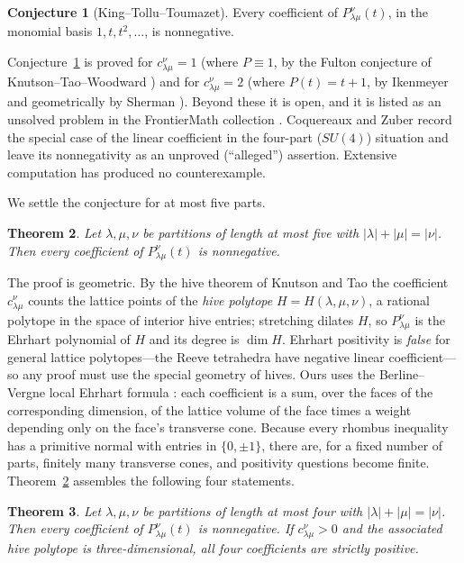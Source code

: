 \documentclass[11pt]{amsart}
\newtheorem{theorem}{Theorem}
\theoremstyle{definition}
\newtheorem{conjecture}[theorem]{Conjecture}
\newcommand{\lam}{\lambda}
\begin{document}
\begin{conjecture}[King--Tollu--Toumazet]\label{conj:ktt}
Every coefficient of $P^{\nu}_{\lam\mu}(t)$, in the monomial basis
$1,t,t^2,\dots$, is nonnegative.
\end{conjecture}

Conjecture~\ref{conj:ktt} is proved for $c^{\nu}_{\lam\mu}=1$
(where $P\equiv 1$, by the Fulton conjecture of Knutson--Tao--Woodward
\cite{KTW}) and for $c^{\nu}_{\lam\mu}=2$ (where $P(t)=t+1$, by Ikenmeyer
\cite{Ikenmeyer} and geometrically by Sherman \cite{Sherman}). Beyond these it
is open, and it is listed as an unsolved problem in the FrontierMath collection
\cite{FrontierMath}. Coquereaux and Zuber \cite{CoqZuber} record the special
case of the linear coefficient in the four-part ($SU(4)$) situation and leave
its nonnegativity as an unproved (``alleged'') assertion. Extensive computation
has produced no counterexample.

We settle the conjecture for at most five parts.

\begin{theorem}\label{thm:main}
Let $\lam,\mu,\nu$ be partitions of length at most five with
$|\lam|+|\mu|=|\nu|$. Then every coefficient of $P^{\nu}_{\lam\mu}(t)$ is
nonnegative.
\end{theorem}

The proof is geometric. By the hive theorem of Knutson and Tao \cite{KnutsonTao}
the coefficient $c^{\nu}_{\lam\mu}$ counts the lattice points of the
\emph{hive polytope} $H=H(\lam,\mu,\nu)$, a rational polytope in the space of
interior hive entries; stretching dilates $H$, so $P^{\nu}_{\lam\mu}$ is the
Ehrhart polynomial of $H$ and its degree is $\dim H$. Ehrhart positivity is
\emph{false} for general lattice polytopes---the Reeve tetrahedra have negative
linear coefficient---so any proof must use the special geometry of hives. Ours
uses the Berline--Vergne local Ehrhart formula \cite{BerlineVergne,RingSchurmann}:
each coefficient is a sum, over the faces of the corresponding dimension, of the
lattice volume of the face times a weight depending only on the face's
transverse cone. Because every rhombus inequality has a primitive normal with
entries in $\{0,\pm1\}$, there are, for a fixed number of parts, finitely many
transverse cones, and positivity questions become finite. Theorem~\ref{thm:main}
assembles the following four statements.

\begin{theorem}\label{thm:four}
Let $\lam,\mu,\nu$ be partitions of length at most four with
$|\lam|+|\mu|=|\nu|$. Then every coefficient of $P^{\nu}_{\lam\mu}(t)$ is
nonnegative. If $c^{\nu}_{\lam\mu}>0$ and the associated hive polytope is
three-dimensional, all four coefficients are strictly positive.
\end{theorem}
\end{document}
